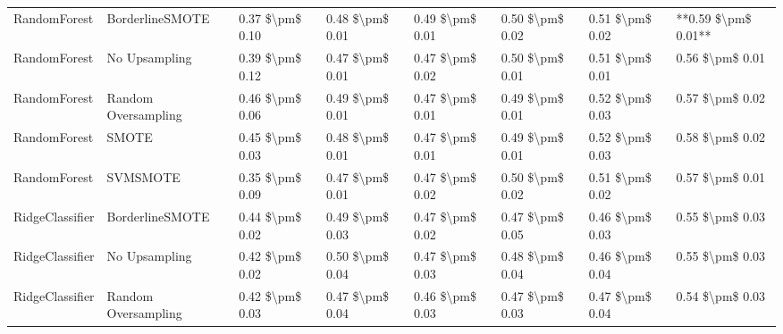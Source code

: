 \begin{tabular}{llllllll}
                   RandomForest &               BorderlineSMOTE & 0.37 \$\textbackslash pm\$ 0.10 &           0.48 \$\textbackslash pm\$ 0.01 &       0.49 \$\textbackslash pm\$ 0.01 &        0.50 \$\textbackslash pm\$ 0.02 &                         0.51 \$\textbackslash pm\$ 0.02 & **0.59 \$\textbackslash pm\$ 0.01** \\
                   RandomForest &                 No Upsampling & 0.39 \$\textbackslash pm\$ 0.12 &           0.47 \$\textbackslash pm\$ 0.01 &       0.47 \$\textbackslash pm\$ 0.02 &        0.50 \$\textbackslash pm\$ 0.01 &                         0.51 \$\textbackslash pm\$ 0.01 &     0.56 \$\textbackslash pm\$ 0.01 \\
                   RandomForest &           Random Oversampling & 0.46 \$\textbackslash pm\$ 0.06 &           0.49 \$\textbackslash pm\$ 0.01 &       0.47 \$\textbackslash pm\$ 0.01 &        0.49 \$\textbackslash pm\$ 0.01 &                         0.52 \$\textbackslash pm\$ 0.03 &     0.57 \$\textbackslash pm\$ 0.02 \\
                   RandomForest &                         SMOTE & 0.45 \$\textbackslash pm\$ 0.03 &           0.48 \$\textbackslash pm\$ 0.01 &       0.47 \$\textbackslash pm\$ 0.01 &        0.49 \$\textbackslash pm\$ 0.01 &                         0.52 \$\textbackslash pm\$ 0.03 &     0.58 \$\textbackslash pm\$ 0.02 \\
                   RandomForest &                      SVMSMOTE & 0.35 \$\textbackslash pm\$ 0.09 &           0.47 \$\textbackslash pm\$ 0.01 &       0.47 \$\textbackslash pm\$ 0.02 &        0.50 \$\textbackslash pm\$ 0.02 &                         0.51 \$\textbackslash pm\$ 0.02 &     0.57 \$\textbackslash pm\$ 0.01 \\
                RidgeClassifier &               BorderlineSMOTE & 0.44 \$\textbackslash pm\$ 0.02 &           0.49 \$\textbackslash pm\$ 0.03 &       0.47 \$\textbackslash pm\$ 0.02 &        0.47 \$\textbackslash pm\$ 0.05 &                         0.46 \$\textbackslash pm\$ 0.03 &     0.55 \$\textbackslash pm\$ 0.03 \\
                RidgeClassifier &                 No Upsampling & 0.42 \$\textbackslash pm\$ 0.02 &           0.50 \$\textbackslash pm\$ 0.04 &       0.47 \$\textbackslash pm\$ 0.03 &        0.48 \$\textbackslash pm\$ 0.04 &                         0.46 \$\textbackslash pm\$ 0.04 &     0.55 \$\textbackslash pm\$ 0.03 \\
                RidgeClassifier &           Random Oversampling & 0.42 \$\textbackslash pm\$ 0.03 &           0.47 \$\textbackslash pm\$ 0.04 &       0.46 \$\textbackslash pm\$ 0.03 &        0.47 \$\textbackslash pm\$ 0.03 &                         0.47 \$\textbackslash pm\$ 0.04 &     0.54 \$\textbackslash pm\$ 0.03 \\

\end{tabular}
